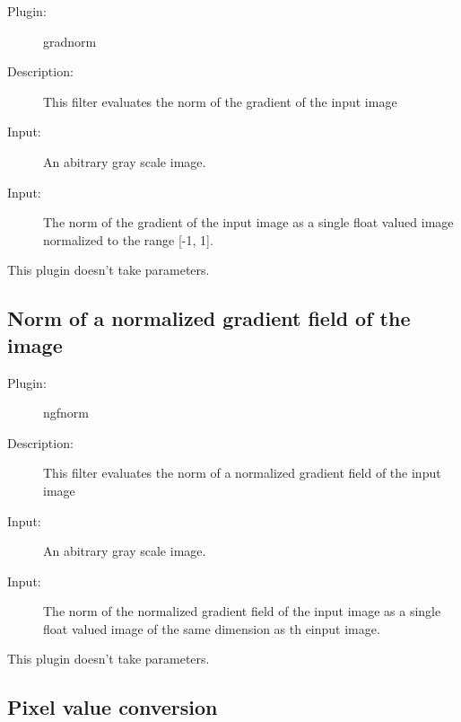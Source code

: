    \begin{description}
   
   \item [Plugin:] gradnorm
   \item [Description:] This filter evaluates the norm of the gradient of the input image
   \item [Input:] An abitrary gray scale image. 
   \item [Input:] The norm of the gradient of the input image as a single float valued 
             image normalized to the range [-1, 1]. 
   
   \end{description}
   This plugin doesn't take parameters. 

   
   \subsection{Norm of a normalized gradient field of the image}
   \label{filter2d:ngfnorm}
   
   \begin{description}
   
   \item [Plugin:] ngfnorm
   \item [Description:] This filter evaluates the norm of a normalized gradient field of the input image
   \item [Input:] An abitrary gray scale image. 
   \item [Input:] The norm of the normalized gradient field of the input image as a single float valued 
             image of the same dimension as th einput image. 
   
   \end{description}
   This plugin doesn't take parameters. 

   
   \subsection{Pixel value conversion}
   \label{filter2d:convert}
   
